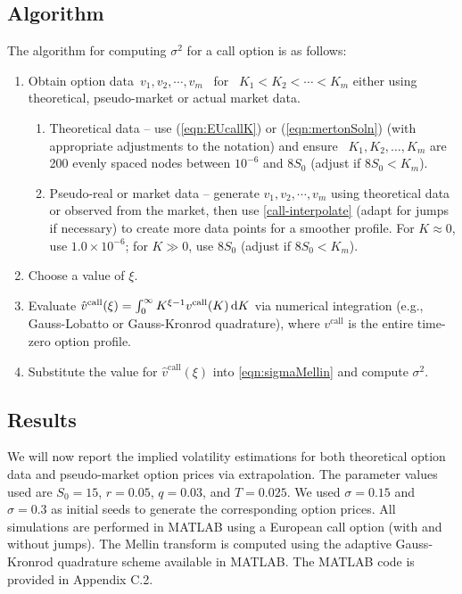 \subsection{Algorithm}
The algorithm for computing $\sigma^2$ for a call option is as follows:
	\begin{enumerate}
		\item Obtain option data~$v_1, v_2,  \cdots,  v_m$~ for ~$K_1 < K_2 < \cdots < K_m$ either using theoretical, pseudo-market or actual market data.
			\begin{enumerate}
				\item Theoretical data -- use (\ref{eqn:EUcallK}) or (\ref{eqn:mertonSoln}) (with appropriate adjustments to the notation) and ensure ~$K_1, K_2, \hdots, K_m$ are 200 evenly spaced nodes between $10^{-6}$ and $8S_0$ (adjust if $8S_0 < K_m$).
				\item Pseudo-real or market data -- generate $v_1, v_2, \cdots, v_m$ using theoretical data or observed from the market, then use \eqref{call-interpolate} (adapt for jumps if necessary) to create more data points for a smoother profile. For $K \approx 0$, use $1.0\times10^{-6}$; for $K \gg 0$, use $8S_0$ (adjust if $8S_0 < K_m$).
			\end{enumerate}
		\item Choose a value of $\xi$.
		\item Evaluate $\hat v^\text{call}(\xi) = \int_0^\infty K^{\xi - 1} v^\text{call}(K) \, \mathrm d K$ via numerical integration (e.g., Gauss-Lobatto or Gauss-Kronrod quadrature), where $v^\text{call}$ is the entire time-zero option profile.
		\item Substitute the value for $\hat v^\text{call}(\xi)$ into \eqref{eqn:sigmaMellin} and compute $\sigma^2$.
	\end{enumerate}


\subsection{Results}

We will now report the implied volatility estimations for both theoretical option data and pseudo-market option prices via extrapolation. The parameter values used are $S_0 = 15$, $r = 0.05$, $q = 0.03$, and $T = 0.025$. We used $\sigma = 0.15$ and $\sigma = 0.3$ as initial seeds to generate the corresponding option prices. All simulations are performed in MATLAB using a European call option (with and without jumps). The Mellin transform is computed using the adaptive Gauss-Kronrod quadrature scheme available in MATLAB. The MATLAB code is provided in Appendix C.2.

